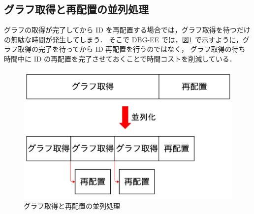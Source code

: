 \subsection{グラフ取得と再配置の並列処理}
グラフの取得が完了してから ID を再配置する場合では，グラフ取得を待つだけの無駄な時間が発生してしまう．
そこで DBG-EE では，図\ref{dbg-ee_para} で示すように，グラフ取得の完了を待ってから ID 再配置を行うのではなく，
グラフ取得の待ち時間中に ID の再配置を完了させておくことで時間コストを削減している．
\begin{figure}[t]
  \centering
  \includegraphics[width=0.8\linewidth]{./figure/dbg-ee_para.pdf}
  \caption{グラフ取得と再配置の並列処理}
  \label{dbg-ee_para}
\end{figure}